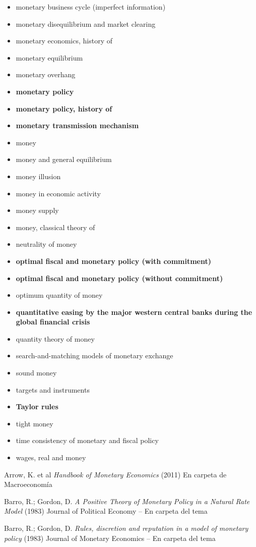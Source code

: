 \documentclass{nuevotema}
\begin{document}
\begin{itemize}
	\item monetary business cycle (imperfect information)
	\item monetary disequilibrium and market clearing
	\item monetary economics, history of
	\item monetary equilibrium
	\item monetary overhang
	\item \textbf{monetary policy}
	\item \textbf{monetary policy, history of}
	\item \textbf{monetary transmission mechanism}
	\item money
	\item money and general equilibrium
	\item money illusion
	\item money in economic activity
	\item money supply
	\item money, classical theory of
	\item neutrality of money
	\item \textbf{optimal fiscal and monetary policy (with commitment)}
	\item \textbf{optimal fiscal and monetary policy (without commitment)}
	\item optimum quantity of money
	\item \textbf{quantitative easing by the major western central banks during the global financial crisis}
	\item quantity theory of money
	\item search-and-matching models of monetary exchange
	\item sound money
	\item targets and instruments
	\item \textbf{Taylor rules}
	\item tight money
	\item time consistency of monetary and fiscal policy
	\item wages, real and money
\end{itemize}

Arrow, K. et al \textit{Handbook of Monetary Economics} (2011) En carpeta de Macroeconomía

Barro, R.; Gordon, D. \textit{A Positive Theory of Monetary Policy in a Natural Rate Model} (1983) Journal of Political Economy -- En carpeta del tema

Barro, R.; Gordon, D. \textit{Rules, discretion and reputation in a model of monetary policy} (1983) Journal of Monetary Economics -- En carpeta del tema
\end{document}
